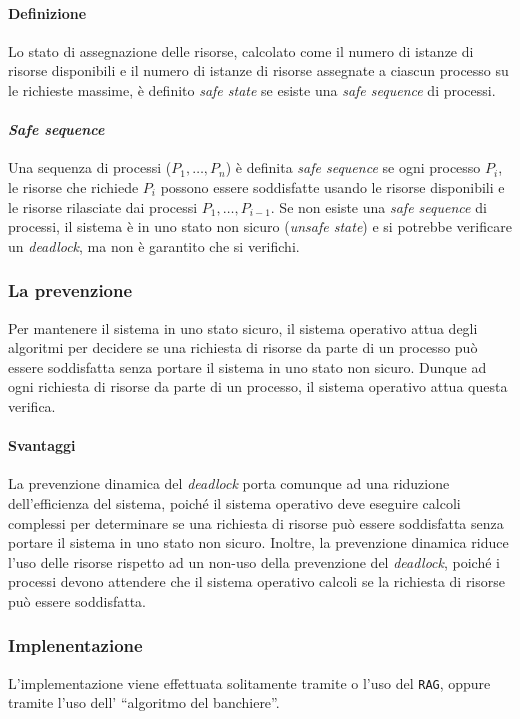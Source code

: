             \paragraph{Definizione} 
                Lo stato di assegnazione delle risorse, calcolato come il numero di istanze di risorse disponibili e il numero di istanze di risorse assegnate a ciascun processo su le richieste massime, è definito \textit{safe state} se esiste una \textit{safe sequence} di processi.
            \paragraph{\textit{Safe sequence}}
                Una sequenza di processi ($P_1,\dots,P_n$) è definita \textit{safe sequence} se ogni processo $P_i$, le risorse che richiede $P_i$ possono essere soddisfatte usando le risorse disponibili e le risorse rilasciate dai processi $P_1,\dots,P_{i-1}$.\newline
                Se non esiste una \textit{safe sequence} di processi, il sistema è in uno stato non sicuro (\textit{unsafe state}) e si potrebbe verificare un \textit{deadlock}, ma non è garantito che si verifichi. 
        \subsubsection{La prevenzione}
            Per mantenere il sistema in uno stato sicuro, il sistema operativo attua degli algoritmi per decidere se una richiesta di risorse da parte di un processo può essere soddisfatta senza portare il sistema in uno stato non sicuro. Dunque ad ogni richiesta di risorse da parte di un processo, il sistema operativo attua questa verifica.
            \paragraph{Svantaggi} 
                La prevenzione dinamica del \textit{deadlock} porta comunque ad una riduzione dell'efficienza del sistema, poiché il sistema operativo deve eseguire calcoli complessi per determinare se una richiesta di risorse può essere soddisfatta senza portare il sistema in uno stato non sicuro. Inoltre, la prevenzione dinamica riduce l'uso delle risorse rispetto ad un non-uso della prevenzione del \textit{deadlock}, poiché i processi devono attendere che il sistema operativo calcoli se la richiesta di risorse può essere soddisfatta.
        \subsubsection{Implenentazione}
            L'implementazione viene effettuata solitamente tramite o l'uso del \texttt{RAG}, oppure tramite l'uso dell' ``algoritmo del banchiere''.
